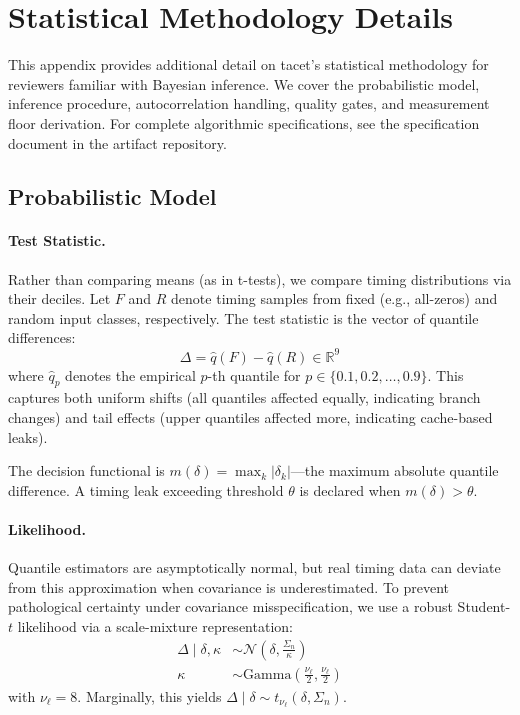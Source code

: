 
\section{Statistical Methodology Details}
\label{app:methodology}

This appendix provides additional detail on tacet's statistical methodology for reviewers familiar with Bayesian inference. We cover the probabilistic model, inference procedure, autocorrelation handling, quality gates, and measurement floor derivation. For complete algorithmic specifications, see the specification document in the artifact repository.

\subsection{Probabilistic Model}
\label{app:model}

\paragraph{Test Statistic.}
Rather than comparing means (as in t-tests), we compare timing distributions via their deciles. Let $F$ and $R$ denote timing samples from fixed (e.g., all-zeros) and random input classes, respectively. The test statistic is the vector of quantile differences:
\begin{equation}
\Delta = \hat{q}(F) - \hat{q}(R) \in \mathbb{R}^9
\end{equation}
where $\hat{q}_p$ denotes the empirical $p$-th quantile for $p \in \{0.1, 0.2, \ldots, 0.9\}$. This captures both uniform shifts (all quantiles affected equally, indicating branch changes) and tail effects (upper quantiles affected more, indicating cache-based leaks).

The decision functional is $m(\delta) = \max_k |\delta_k|$---the maximum absolute quantile difference. A timing leak exceeding threshold $\theta$ is declared when $m(\delta) > \theta$.

\paragraph{Likelihood.}
Quantile estimators are asymptotically normal, but real timing data can deviate from this approximation when covariance is underestimated. To prevent pathological certainty under covariance misspecification, we use a robust Student-$t$ likelihood via a scale-mixture representation:
\begin{align}
\Delta \mid \delta, \kappa &\sim \mathcal{N}\!\left(\delta, \frac{\Sigma_n}{\kappa}\right) \\
\kappa &\sim \text{Gamma}\!\left(\frac{\nu_\ell}{2}, \frac{\nu_\ell}{2}\right)
\end{align}
with $\nu_\ell = 8$. Marginally, this yields $\Delta \mid \delta \sim t_{\nu_\ell}(\delta, \Sigma_n)$.

